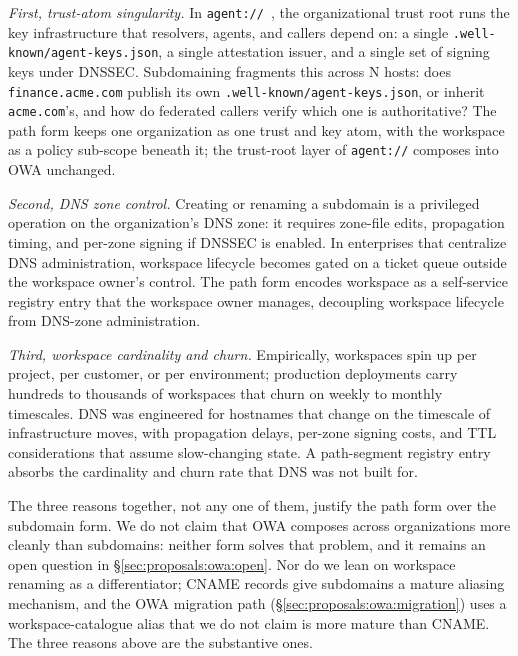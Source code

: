 \emph{First, trust-atom singularity.} In
\texttt{agent://}~\cite{agent_uri_scheme}, the
organizational trust root runs the key infrastructure that
resolvers, agents, and callers depend on: a single
\texttt{.well-known/agent-keys.json}, a single attestation
issuer, and a single set of signing keys under DNSSEC.
Subdomaining fragments this across N hosts: does
\texttt{finance.acme.com} publish its own
\texttt{.well-known/agent-keys.json}, or inherit
\texttt{acme.com}'s, and how do federated callers verify
which one is authoritative? The path form keeps one
organization as one trust and key atom, with the workspace
as a policy sub-scope beneath it; the trust-root layer of
\texttt{agent://} composes into OWA unchanged.

\emph{Second, DNS zone control.} Creating or renaming a
subdomain is a privileged operation on the organization's
DNS zone: it requires zone-file edits, propagation
timing, and per-zone signing if DNSSEC is enabled. In
enterprises that centralize DNS administration, workspace
lifecycle becomes gated on a ticket queue outside the
workspace owner's control. The path form encodes workspace
as a self-service registry entry that the workspace owner
manages, decoupling workspace lifecycle from DNS-zone
administration.

\emph{Third, workspace cardinality and churn.} Empirically,
workspaces spin up per project, per customer, or per
environment; production deployments carry hundreds to
thousands of workspaces that churn on weekly to monthly
timescales. DNS was engineered for hostnames that change
on the timescale of infrastructure moves, with propagation
delays, per-zone signing costs, and TTL considerations
that assume slow-changing state. A path-segment registry
entry absorbs the cardinality and churn rate that DNS was
not built for.

The three reasons together, not any one of them, justify
the path form over the subdomain form. We do not claim
that OWA composes across organizations more cleanly than
subdomains: neither form solves that problem, and it
remains an open question in
\S\ref{sec:proposals:owa:open}. Nor do we lean on
workspace renaming as a differentiator; CNAME records give
subdomains a mature aliasing mechanism, and the OWA
migration path (\S\ref{sec:proposals:owa:migration}) uses
a workspace-catalogue alias that we do not claim is more
mature than CNAME. The three reasons above are the
substantive ones.

